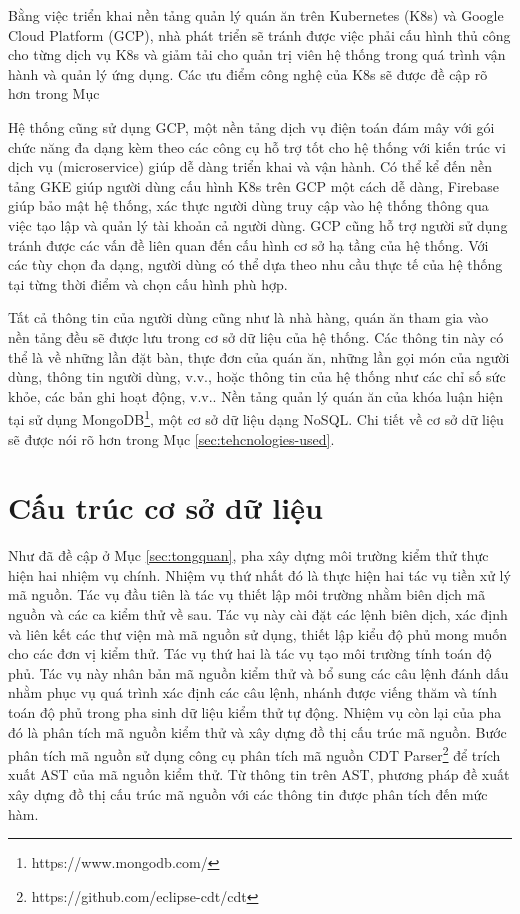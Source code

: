 Bằng việc triển khai nền tảng quản lý quán ăn trên Kubernetes (K8s) và Google Cloud Platform (GCP), nhà phát triển sẽ tránh được việc phải cấu hình thủ công cho từng dịch vụ K8s và giảm tải cho quản trị viên hệ thống trong quá trình vận hành và quản lý ứng dụng.
Các ưu điểm công nghệ của K8s sẽ được đề cập rõ hơn trong Mục~

Hệ thống cũng sử dụng GCP, một nền tảng dịch vụ điện toán đám mây với gói chức năng đa dạng kèm theo các công cụ hỗ trợ tốt cho hệ thống với kiến trúc vi dịch vụ (microservice) giúp dễ dàng triển khai và vận hành.
Có thể kể đến nền tảng GKE giúp người dùng cấu hình K8s trên GCP một cách dễ dàng, Firebase giúp bảo mật hệ thống, xác thực người dùng truy cập vào hệ thống thông qua việc tạo lập và quản lý tài khoản cả người dùng.
GCP cũng hỗ trợ người sử dụng tránh được các vấn đề liên quan đến cấu hình cơ sở hạ tầng của hệ thống.
Với các tùy chọn đa dạng, người dùng có thể dựa theo nhu cầu thực tế của hệ thống tại từng thời điểm và chọn cấu hình phù hợp.

Tất cả thông tin của người dùng cũng như là nhà hàng, quán ăn tham gia vào nền tảng đều sẽ được lưu trong cơ sở dữ liệu của hệ thống. Các thông tin này có thể là về những lần đặt bàn, thực đơn của quán ăn, những lần gọi món của người dùng, thông tin người dùng, v.v., hoặc thông tin của hệ thống như các chỉ số sức khỏe, các bản ghi hoạt động, v.v.. Nền tảng quản lý quán ăn của khóa luận hiện tại sử dụng MongoDB\footnote{https://www.mongodb.com/}, một cơ sở dữ liệu dạng NoSQL. Chi tiết về cơ sở dữ liệu sẽ được nói rõ hơn trong Mục \autoref{sec:tehcnologies-used}.

\section{Cấu trúc cơ sở dữ liệu} \label{sec:database-design}
Như đã đề cập ở Mục \autoref{sec:tongquan}, pha xây dựng môi trường kiểm thử thực hiện hai nhiệm vụ chính. Nhiệm vụ thứ nhất đó là thực hiện hai tác vụ tiền xử lý mã nguồn. Tác vụ đầu tiên là tác vụ thiết lập môi trường nhằm biên dịch mã nguồn và các ca kiểm thử về sau. Tác vụ này cài đặt các lệnh biên dịch, xác định và liên kết các thư viện mà mã nguồn sử dụng, thiết lập kiểu độ phủ mong muốn cho các đơn vị kiểm thử. Tác vụ thứ hai là tác vụ tạo môi trường tính toán độ phủ. Tác vụ này nhân bản mã nguồn kiểm thử và bổ sung các câu lệnh đánh dấu nhằm phục vụ quá trình xác định các câu lệnh, nhánh được viếng thăm và tính toán độ phủ trong pha sinh dữ liệu kiểm thử tự động. Nhiệm vụ còn lại của pha đó là phân tích mã nguồn kiểm thử và xây dựng đồ thị cấu trúc mã nguồn. Bước phân tích mã nguồn sử dụng công cụ phân tích mã nguồn CDT Parser\footnote{https://github.com/eclipse-cdt/cdt} để trích xuất AST của mã nguồn kiểm thử. Từ thông tin trên AST, phương pháp đề xuất xây dựng đồ thị cấu trúc mã nguồn với các thông tin được phân tích đến mức hàm.

